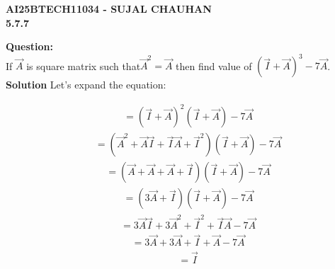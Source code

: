 \documentclass[12pt]{article}
\begin{document}
\newpage
\begin{center}
\textbf{\Large AI25BTECH11034 - SUJAL CHAUHAN }\\
\textbf{5.7.7}
\end{center}

\textbf{Question:}
\vspace{1cm}
\\
If $\Vec{A}$ is square matrix such that$ \Vec{A}^2=\Vec{A}$ then find value of $(\Vec{I}+\Vec{A})^3-7\Vec{A}$.
\vspace{1cm}
\\
\textbf{ Solution}
Let's expand the equation:


\begin{align}
    &= (\Vec{I} + \Vec{A})^2 (\Vec{I} + \Vec{A}) - 7 \Vec{A}
\end{align}
\begin{align}
    &= (\Vec{A}^2 + \Vec{A} \Vec{I} + \Vec{I} \Vec{A} + \Vec{I}^2) (\Vec{I} + \Vec{A}) - 7 \Vec{A}
\end{align}
\begin{align}
    &= (\Vec{A} + \Vec{A} + \Vec{A} + \Vec{I}) (\Vec{I} + \Vec{A}) - 7 \Vec{A}
\end{align}
\begin{align}
    &= (3\Vec{A} + \Vec{I}) (\Vec{I} + \Vec{A}) - 7 \Vec{A}
\end{align}
\begin{align}
    &= 3\Vec{A}\Vec{I} + 3\Vec{A}^2 + \Vec{I}^2 + \Vec{I}\Vec{A} - 7 \Vec{A}
\end{align}
\begin{align}
    &= 3\Vec{A} + 3\Vec{A} + \Vec{I} + \Vec{A} - 7 \Vec{A}
\end{align}
\begin{align}
    &= \Vec{I}
\end{align}
\end{document}
